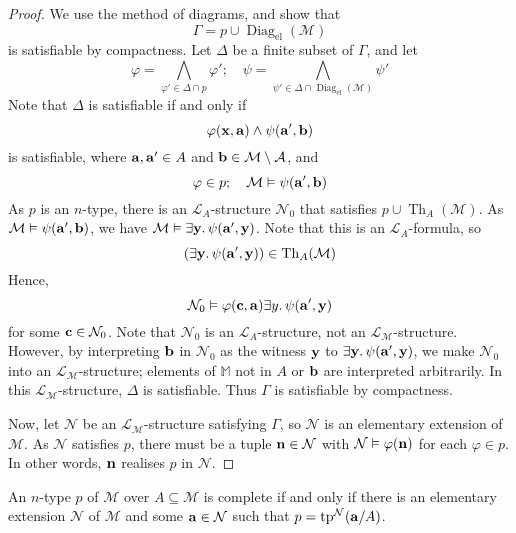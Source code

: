 \begin{proof}
    We use the method of diagrams, and show that
    \[ \Gamma = p \cup \operatorname{Diag}_{\text{el}}(\mathcal M) \]
    is satisfiable by compactness.
    Let \( \Delta \) be a finite subset of \( \Gamma \), and let
    \[ \varphi = \bigwedge_{\varphi' \in \Delta \cap p} \varphi';\quad \psi = \bigwedge_{\psi' \in \Delta \cap \operatorname{Diag}_{\text{el}}(\mathcal M)} \psi' \]
    Note that \( \Delta \) is satisfiable if and only if
    \[ \varphi(\vb x, \vb a) \wedge \psi(\vb a', \vb b) \]
    is satisfiable, where \( \vb a, \vb a' \in A \) and \( \vb b \in \mathcal M \setminus \mathcal A \), and
    \[ \varphi \in p;\quad \mathcal M \vDash \psi(\vb a', \vb b) \]
    As \( p \) is an \( n \)-type, there is an \( \mathcal L_A \)-structure \( \mathcal N_0 \) that satisfies \( p \cup \operatorname{Th}_A(\mathcal M) \).
    As \( \mathcal M \vDash \psi(\vb a', \vb b) \), we have \( \mathcal M \vDash \exists \vb y.\, \psi(\vb a', \vb y) \).
    Note that this is an \( \mathcal L_A \)-formula, so
    \[ (\exists \vb y.\, \psi(\vb a', \vb y)) \in \operatorname{Th}_A(\mathcal M) \]
    Hence,
    \[ \mathcal N_0 \vDash \varphi(\vb c, \vb a) \exists y.\, \psi(\vb a', \vb y) \]
    for some \( \vb c \in \mathcal N_0 \).
    Note that \( \mathcal N_0 \) is an \( \mathcal L_A \)-structure, not an \( \mathcal L_{\mathcal M} \)-structure.
    However, by interpreting \( \vb b \) in \( \mathcal N_0 \) as the witness \( \vb y \) to \( \exists \vb y.\, \psi(\vb a', \vb y) \), we make \( \mathcal N_0 \) into an \( \mathcal L_{\mathcal M} \)-structure; elements of \( \mathbb M \) not in \( A \) or \( \vb b \) are interpreted arbitrarily.
    In this \( \mathcal L_{\mathcal M} \)-structure, \( \Delta \) is satisfiable.
    Thus \( \Gamma \) is satisfiable by compactness.

    Now, let \( \mathcal N \) be an \( \mathcal L_{\mathcal M} \)-structure satisfying \( \Gamma \), so \( \mathcal N \) is an elementary extension of \( \mathcal M \).
    As \( \mathcal N \) satisfies \( p \), there must be a tuple \( \vb n \in \mathcal N \) with \( \mathcal N \vDash \varphi(\vb n) \) for each \( \varphi \in p \).
    In other words, \( \vb n \) realises \( p \) in \( \mathcal N \).
\end{proof}
\begin{corollary}
    An \( n \)-type \( p \) of \( \mathcal M \) over \( A \subseteq \mathcal M \) is complete if and only if there is an elementary extension \( \mathcal N \) of \( \mathcal M \) and some \( \vb a \in \mathcal N \) such that \( p = \operatorname{tp}^{\mathcal N}(\vb a/A) \).
\end{corollary}
